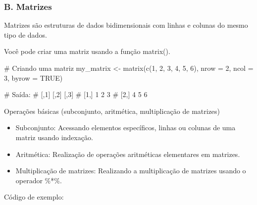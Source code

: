 \documentclass[
  letterpaper,
  DIV=11,
  numbers=noendperiod]{scrartcl}
\newenvironment{Shaded}{\begin{snugshade}}{\end{snugshade}}
\newcommand{\AttributeTok}[1]{\textcolor[rgb]{0.40,0.45,0.13}{#1}}
\newcommand{\CommentTok}[1]{\textcolor[rgb]{0.37,0.37,0.37}{#1}}
\newcommand{\ConstantTok}[1]{\textcolor[rgb]{0.56,0.35,0.01}{#1}}
\newcommand{\DecValTok}[1]{\textcolor[rgb]{0.68,0.00,0.00}{#1}}
\newcommand{\FunctionTok}[1]{\textcolor[rgb]{0.28,0.35,0.67}{#1}}
\newcommand{\NormalTok}[1]{\textcolor[rgb]{0.00,0.23,0.31}{#1}}
\newcommand{\OtherTok}[1]{\textcolor[rgb]{0.00,0.23,0.31}{#1}}
\begin{document}
\hypertarget{b.-matrizes}{%
\subsubsection{B. Matrizes}\label{b.-matrizes}}

Matrizes são estruturas de dados bidimensionais com linhas e colunas do
mesmo tipo de dados.

Você pode criar uma matriz usando a função matrix().

\begin{Shaded}
\begin{Highlighting}[]
\CommentTok{\# Criando uma matriz}
\NormalTok{my\_matrix }\OtherTok{\textless{}{-}} \FunctionTok{matrix}\NormalTok{(}\FunctionTok{c}\NormalTok{(}\DecValTok{1}\NormalTok{, }\DecValTok{2}\NormalTok{, }\DecValTok{3}\NormalTok{, }\DecValTok{4}\NormalTok{, }\DecValTok{5}\NormalTok{, }\DecValTok{6}\NormalTok{), }\AttributeTok{nrow =} \DecValTok{2}\NormalTok{, }\AttributeTok{ncol =} \DecValTok{3}\NormalTok{, }\AttributeTok{byrow =} \ConstantTok{TRUE}\NormalTok{)}

\CommentTok{\# Saída:}
\CommentTok{\# [,1] [,2] [,3]}
\CommentTok{\# [1,] 1 2 3}
\CommentTok{\# [2,] 4 5 6}
\end{Highlighting}
\end{Shaded}

Operações básicas (subconjunto, aritmética, multiplicação de matrizes)

\begin{itemize}
\item
  Subconjunto: Acessando elementos específicos, linhas ou colunas de uma
  matriz usando indexação.
\item
  Aritmética: Realização de operações aritméticas elementares em
  matrizes.
\item
  Multiplicação de matrizes: Realizando a multiplicação de matrizes
  usando o operador \%*\%.
\end{itemize}

Código de exemplo:
\end{document}
